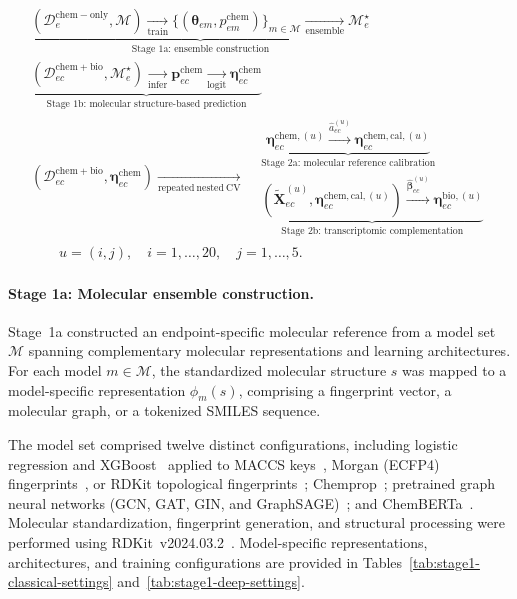 \documentclass[11pt,a4paper]{article}
\begin{document}
\begin{equation}
\begin{gathered}
\underbrace{
(\mathcal D^{\mathrm{chem-only}}_e,\mathcal M)
\underset{\mathrm{train}}{\longrightarrow}
\{(\boldsymbol\theta_{em},p^{\mathrm{chem}}_{em})\}_{m\in\mathcal M}
\underset{\mathrm{ensemble}}{\longrightarrow}
\mathcal M_e^\star
}_{\text{Stage 1a: ensemble construction}}
\\[2ex]
%
\underbrace{
(\mathcal D^{\mathrm{chem+bio}}_{ec},\mathcal M_e^\star)
\underset{\mathrm{infer}}{\longrightarrow}
\mathbf p^{\mathrm{chem}}_{ec}
\underset{\mathrm{logit}}{\longrightarrow}
\boldsymbol\eta^{\mathrm{chem}}_{ec}
}_{\text{Stage 1b: molecular structure-based prediction}}
\\[2ex]
%
(\mathcal D^{\mathrm{chem+bio}}_{ec},
\boldsymbol\eta^{\mathrm{chem}}_{ec})
\underset{\mathrm{repeated\ nested\ CV}}{\longrightarrow}
\boxed{
\begin{aligned}
&
\underbrace{
\boldsymbol\eta^{\mathrm{chem},(u)}_{ec}
\overset{\widehat a_{ec}^{(u)}}{\longrightarrow}
\boldsymbol\eta^{\mathrm{chem,cal},(u)}_{ec}
}_{\text{Stage 2a: molecular reference calibration}}
\\[2ex]
&
\underbrace{
(\widetilde{\mathbf X}^{(u)}_{ec},
\boldsymbol\eta^{\mathrm{chem,cal},(u)}_{ec})
\overset{\widehat{\boldsymbol\beta}_{ec}^{(u)}}{\longrightarrow}
\boldsymbol\eta^{\mathrm{bio},(u)}_{ec}
}_{\text{Stage 2b: transcriptomic complementation}}
\end{aligned}
}
\\[-0.5ex]
\qquad
u=(i,j),\quad
i=1,\ldots,20,\quad
j=1,\ldots,5.
\end{gathered}
\label{eq:two-stage-overview}
\end{equation}

\paragraph{Stage 1a: Molecular ensemble construction.}

Stage~1a constructed an endpoint-specific molecular reference from a model
set \(\mathcal M\) spanning complementary molecular
representations and learning architectures. For each model \(m\in\mathcal M\),
the standardized molecular structure \(s\) was mapped to a model-specific
representation \(\phi_m(s)\), comprising a fingerprint vector, a molecular
graph, or a tokenized SMILES sequence.

The model set comprised twelve distinct configurations, including logistic regression and
XGBoost~\cite{chen2016xgboost} applied to MACCS
keys~\cite{durant2002mdl}, Morgan (ECFP4)
fingerprints~\cite{rogers2010extended}, or RDKit topological
fingerprints~\cite{landrum2024rdkit}; Chemprop~\cite{yang2019analyzing};
pretrained graph neural networks (GCN, GAT, GIN, and
GraphSAGE)~\cite{hu2020strategies}; and
ChemBERTa~\cite{chithrananda2020chemberta}. Molecular standardization,
fingerprint generation, and structural processing were performed using
RDKit~v2024.03.2~\cite{landrum2024rdkit}. Model-specific representations,
architectures, and training configurations are provided in
Tables~\ref{tab:stage1-classical-settings}
and~\ref{tab:stage1-deep-settings}.
\end{document}
